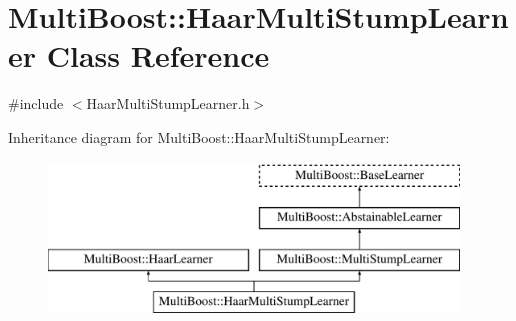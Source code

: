 \hypertarget{classMultiBoost_1_1HaarMultiStumpLearner}{
\section{MultiBoost::HaarMultiStumpLearner Class Reference}
\label{classMultiBoost_1_1HaarMultiStumpLearner}
}


{\ttfamily \#include $<$HaarMultiStumpLearner.h$>$}

Inheritance diagram for MultiBoost::HaarMultiStumpLearner:\begin{figure}[H]
\begin{center}
\leavevmode
\includegraphics[height=4.000000cm]{classMultiBoost_1_1HaarMultiStumpLearner}
\end{center}
\end{figure}
